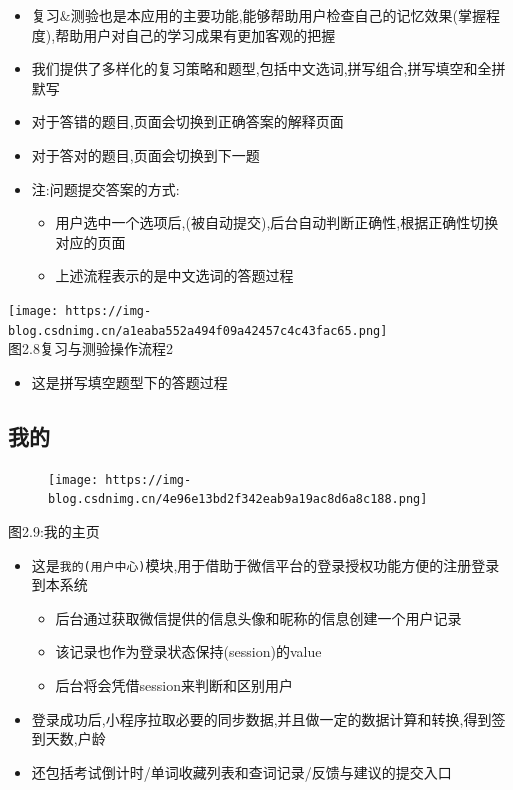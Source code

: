 \documentclass[
]{article}
\begin{document}
\begin{itemize}
\item
  复习\&测验也是本应用的主要功能,能够帮助用户检查自己的记忆效果(掌握程度),帮助用户对自己的学习成果有更加客观的把握
\item
  我们提供了多样化的复习策略和题型,包括中文选词,拼写组合,拼写填空和全拼默写
\item
  对于答错的题目,页面会切换到正确答案的解释页面
\item
  对于答对的题目,页面会切换到下一题
\item
  注:问题提交答案的方式:

  \begin{itemize}
  \item
    用户选中一个选项后,(被自动提交),后台自动判断正确性,根据正确性切换对应的页面
  \item
    上述流程表示的是中文选词的答题过程
  \end{itemize}
\end{itemize}

\texttt{[image: https://img-blog.csdnimg.cn/a1eaba552a494f09a42457c4c43fac65.png]}\\
图2.8复习与测验操作流程2

\begin{itemize}
\item
  这是拼写填空题型下的答题过程
\end{itemize}

\hypertarget{ux6211ux7684-2}{%
\subsection{我的}\label{ux6211ux7684-2}}

\begin{figure}
\centering
\texttt{[image: https://img-blog.csdnimg.cn/4e96e13bd2f342eab9a19ac8d6a8c188.png]}
\caption{}
\end{figure}

图2.9:我的主页

\begin{itemize}
\item
  这是\texttt{我的(用户中心)}模块,用于借助于微信平台的登录授权功能方便的注册登录到本系统

  \begin{itemize}
  \item
    后台通过获取微信提供的信息头像和昵称的信息创建一个用户记录
  \item
    该记录也作为登录状态保持(session)的value
  \item
    后台将会凭借session来判断和区别用户
  \end{itemize}
\item
  登录成功后,小程序拉取必要的同步数据,并且做一定的数据计算和转换,得到签到天数,户龄
\item
  还包括考试倒计时/单词收藏列表和查词记录/反馈与建议的提交入口
\end{itemize}
\end{document}
